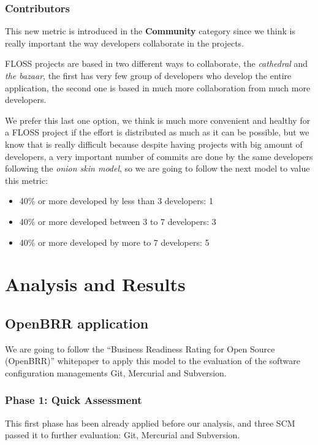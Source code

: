 \documentclass[a4paper,10pt]{article}
\begin{document}
\subsubsection{Contributors} \label{Contributors2}

This new metric is introduced in the \textbf{Community} category since we
think is really important the way developers collaborate in the projects.

FLOSS projects are based in two different ways to collaborate, the
\textit{cathedral} and \textit{the bazaar}, the first has very few group of
developers who develop the entire application, the second one is based in much
more collaboration from much more developers.

We prefer this last one option, we think is much more convenient and healthy
for a FLOSS project if the effort is distributed as much as it can be possible,
but we know that is really difficult because despite having projects with big
amount of developers, a very important number of commits are done by the same
developers following the \textit{onion skin model}, so we are going to follow
the next model to value this metric:

\begin{itemize}
 \item 40\% or more developed by less than 3 developers: 1
 \item 40\% or more developed between 3 to 7 developers: 3
 \item 40\% or more developed by more to 7 developers: 5 
\end{itemize}

\section{Analysis and Results}

\subsection{OpenBRR application}
\label{OpenBRR_application}
We are going to follow the ``Business Readiness Rating for Open Source
(OpenBRR)'' whitepaper\cite{OpenBRRWhitepaper} to apply this model to the
evaluation of the software configuration managements Git, Mercurial and
Subversion.

\subsubsection{Phase 1: Quick Assessment}
This first phase has been already applied before our analysis, and three SCM
passed it to further evaluation: Git, Mercurial and Subversion.
\end{document}
